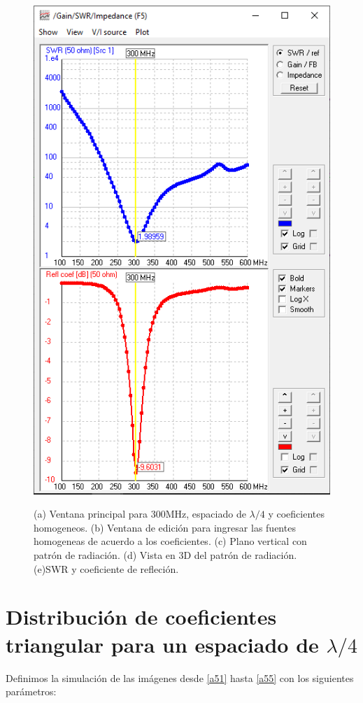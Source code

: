 \documentclass[11pt]{book}
\begin{document}
\begin{figure}[h]
{		\includegraphics[scale=0.30]{IMAGENES/a45}\label{a45}}
	\caption{(a) Ventana principal para 300MHz, espaciado de $\lambda / 4$ y coeficientes homogeneos. (b) Ventana de edición para ingresar las fuentes homogeneas de acuerdo a los coeficientes. (c) Plano vertical con patrón de radiación. (d) Vista en 3D del patrón de radiación. (e)SWR y coeficiente de refleción.}
\end{figure}
\newpage

\section{Distribución de coeficientes triangular para un espaciado de $\lambda/4$}

Definimos la simulación de las imágenes desde \eqref{a51} hasta \eqref{a55} con los siguientes parámetros:
\end{document}
